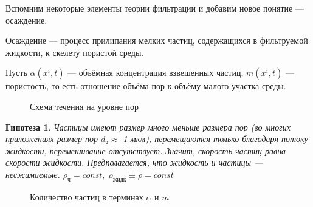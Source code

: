 \documentclass[a4paper,12pt]{article}
\newtheorem*{conjecture}{Гипотеза}
\begin{document}
\par Вспомним некоторые элементы теории фильтрации  и добавим новое понятие --- осаждение.\\
\par Осаждение --- процесс прилипания мелких частиц, содержащихся в фильтруемой жидкости, к скелету пористой среды.\\
\par Пусть $\alpha(x^{i},t)$ --- объёмная концентрация взвешенных частиц, $m(x^{i},t)$ --- пористость, то есть отношение объёма пор к объёму малого участка среды.\\
\begin{figure}[h!]
\caption{Схема течения на уровне пор}
\label{fig:image1}
\end{figure}
\begin{conjecture}
Частицы имеют размер много меньше размера пор (во многих приложениях размер пор $d_{\text{ч}}\approx$ 1 мкм), перемещаются только благодаря потоку жидкости, перемешивание отсутствует. Значит, скорость частиц равна скорости жидкости. Предполагается, что жидкость и частицы --- \textit{несжимаемые}. $\rho_{\text{ч}} = const, \; \rho_{\text{жидк}}\equiv\rho = const$
\end{conjecture}

\begin{figure}[h!]
\caption{Количество частиц в терминах $\alpha$ и $m$}
\label{fig:image2}
\end{figure}
\end{document}
